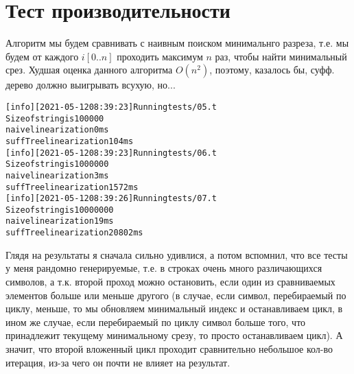 \section{Тест производительности}
Алгоритм мы будем сравнивать с наивным поиском минимальнго разреза, т.е. мы будем от каждого $i[0..n]$ проходить максимум $n$ раз, чтобы
найти минимальный срез. Худшая оценка данного алгоритма $O(n^2)$, поэтому, казалось бы, суфф. дерево должно выигрывать всухую, но...

\begin{alltt}
[info] [2021-05-12 08:39:23] Running tests/05.t
Size of string is 100000
naive linearization 0 ms
suffTree linearization 104 ms
[info] [2021-05-12 08:39:23] Running tests/06.t
Size of string is 1000000
naive linearization 3 ms
suffTree linearization 1572 ms
[info] [2021-05-12 08:39:26] Running tests/07.t
Size of string is 10000000
naive linearization 19 ms
suffTree linearization 20802 ms
    
\end{alltt}

Глядя на результаты я сначала сильно удивлися, а потом вспомнил, что все тесты у меня рандомно генерируемые, т.е. в строках очень много 
различающихся символов, а т.к. второй проход можно остановить, если один из сравниваемых элементов больше или меньше другого
(в случае, если символ, перебираемый по циклу, меньше, то мы обновляем минимальный индекс и останавливаем цикл, в ином же случае, если
перебираемый по циклу символ больше того, что принадлежит текущему минимальному срезу, то просто останавливаем цикл). А значит, что второй
вложенный цикл проходит сравнительно небольшое кол-во итерация, из-за чего он почти не влияет на результат.

\pagebreak

